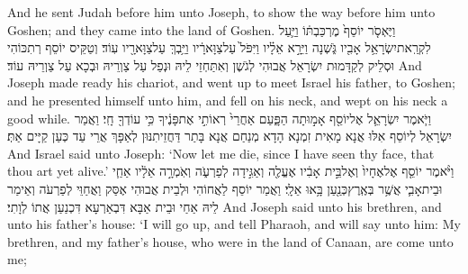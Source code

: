 {And he sent Judah before him unto Joseph, to show the way before him unto Goshen; and they came into the land of Goshen.}{}
{וַיֶּאְסֹ֤ר יוֹסֵף֙ מֶרְכַּבְתּ֔וֹ וַיַּ֛עַל לִקְרַֽאת\maqqaf יִשְׂרָאֵ֥ל אָבִ֖יו גֹּ֑שְׁנָה וַיֵּרָ֣א אֵלָ֗יו וַיִּפֹּל֙ עַל\maqqaf צַוָּארָ֔יו וַיֵּ֥בְךְּ עַל\maqqaf צַוָּארָ֖יו עֽוֹד׃}
{וְטַקֵּיס יוֹסֵף רְתִכּוֹהִי וּסְלֵיק לְקַדָּמוּת יִשְׂרָאֵל אֲבוּהִי לְגֹשֶׁן וְאִתַּחְזֵי לֵיהּ וּנְפַל עַל צַוְרֵיהּ וּבְכָא עַל צַוְרֵיהּ עוֹד׃}
{And Joseph made ready his chariot, and went up to meet Israel his father, to Goshen; and he presented himself unto him, and fell on his neck, and wept on his neck a good while.}{}
{וַיֹּ֧אמֶר יִשְׂרָאֵ֛ל אֶל\maqqaf יוֹסֵ֖ף אָמ֣וּתָה הַפָּ֑עַם אַחֲרֵי֙ רְאוֹתִ֣י אֶת\maqqaf פָּנֶ֔יךָ כִּ֥י עוֹדְךָ֖ חָֽי׃}
{וַאֲמַר יִשְׂרָאֵל לְיוֹסֵף אִלּוּ אֲנָא מָאִית זִמְנָא הָדָא מְנַחַם אֲנָא בָּתַר דַּחֲזֵיתִנּוּן לְאַפָּךְ אֲרֵי עַד כְּעַן קַיָּים אַתְּ׃}
{And Israel said unto Joseph: ‘Now let me die, since I have seen thy face, that thou art yet alive.’}{}
{וַיֹּ֨אמֶר יוֹסֵ֤ף אֶל\maqqaf אֶחָיו֙ וְאֶל\maqqaf בֵּ֣ית אָבִ֔יו אֶעֱלֶ֖ה וְאַגִּ֣ידָה לְפַרְעֹ֑ה וְאֹֽמְרָ֣ה אֵלָ֔יו אַחַ֧י וּבֵית\maqqaf אָבִ֛י אֲשֶׁ֥ר בְּאֶֽרֶץ\maqqaf כְּנַ֖עַן בָּ֥אוּ אֵלָֽי׃}
{וַאֲמַר יוֹסֵף לַאֲחוֹהִי וּלְבֵית אֲבוּהִי אֶסַּק וַאֲחַוֵּי לְפַרְעֹה וְאֵימַר לֵיהּ אַחַי וּבֵית אַבָּא דִּבְאַרְעָא דִּכְנַעַן אֲתוֹ לְוָתִי׃}
{And Joseph said unto his brethren, and unto his father’s house: ‘I will go up, and tell Pharaoh, and will say unto him: My brethren, and my father’s house, who were in the land of Canaan, are come unto me;}{}
